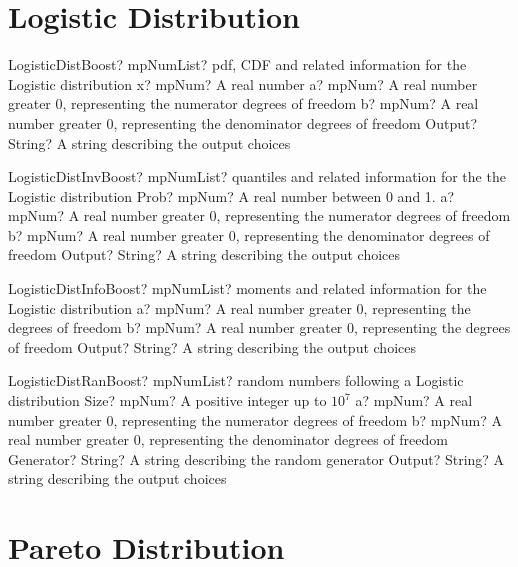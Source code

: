 \documentclass[12pt,a4paper,openany]{book}
\begin{document}
\section{Logistic Distribution}

\begin{mpFunctionsExtract}
\mpFunctionFourNotImplemented
{LogisticDistBoost? mpNumList? pdf, CDF and related information for the Logistic distribution}
{x? mpNum? A real number}
{a? mpNum? A real number greater 0, representing the numerator  degrees of freedom}
{b? mpNum? A real number greater 0, representing the denominator degrees of freedom}
{Output? String? A string describing the output choices}
\end{mpFunctionsExtract}

\begin{mpFunctionsExtract}
\mpFunctionFourNotImplemented
{LogisticDistInvBoost? mpNumList? quantiles and related information for the the Logistic distribution}
{Prob? mpNum? A real number between 0 and 1.}
{a? mpNum? A real number greater 0, representing the numerator  degrees of freedom}
{b? mpNum? A real number greater 0, representing the denominator degrees of freedom}
{Output? String? A string describing the output choices}
\end{mpFunctionsExtract}

\begin{mpFunctionsExtract}
\mpFunctionThreeNotImplemented
{LogisticDistInfoBoost? mpNumList? moments and related information for the Logistic distribution}
{a? mpNum? A real number greater 0, representing the degrees of freedom}
{b? mpNum? A real number greater 0, representing the degrees of freedom}
{Output? String? A string describing the output choices}
\end{mpFunctionsExtract}

\begin{mpFunctionsExtract}
\mpFunctionFiveNotImplemented
{LogisticDistRanBoost? mpNumList? random numbers following a Logistic distribution}
{Size? mpNum? A positive integer up to $10^7$}
{a? mpNum? A real number greater 0, representing the numerator  degrees of freedom}
{b? mpNum? A real number greater 0, representing the denominator degrees of freedom}
{Generator? String? A string describing the random generator}
{Output? String? A string describing the output choices}
\end{mpFunctionsExtract}

\section{Pareto Distribution}
\end{document}
